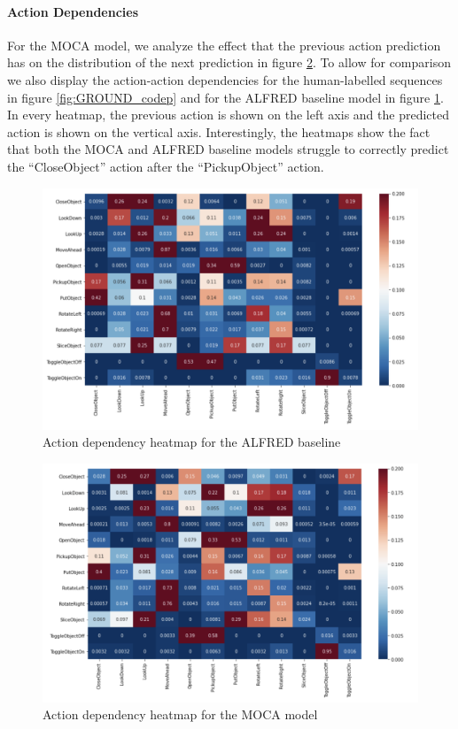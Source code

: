 \documentclass[11pt,a4paper]{article}
\begin{document}
\paragraph{Action Dependencies}

 For the MOCA model, we analyze the effect that the previous action prediction has on the distribution of the next prediction in figure \ref{fig:MOCA_codep}. To allow for comparison we also display the action-action dependencies for the human-labelled sequences in figure  \ref{fig:GROUND_codep} and for the ALFRED baseline model in figure \ref{fig:ALFRED_codep}. In every heatmap, the previous action is shown on the left axis and the predicted action is shown on the vertical axis. Interestingly, the heatmaps show the fact that both the MOCA and ALFRED baseline models struggle to correctly predict the ``CloseObject'' action after the ``PickupObject'' action. 
 
  \begin{figure}
    \centering
    \includegraphics[width=\linewidth]{Reports/4-Analysis-of-Baselines/ALFRED_codep.png}
    \caption{Action dependency heatmap for the ALFRED baseline}
    \label{fig:ALFRED_codep}
\end{figure}
 
 \begin{figure}
    \centering
    \includegraphics[width=\linewidth]{Reports/4-Analysis-of-Baselines/MOCA_codep.png}
    \caption{Action dependency heatmap for the MOCA model}
    \label{fig:MOCA_codep}
\end{figure}
\end{document}
